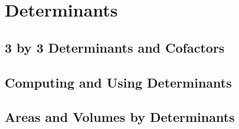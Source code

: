 \chapter{Determinants}
\section{3 by 3 Determinants and Cofactors}
\section{Computing and Using Determinants}
\section{Areas and Volumes by Determinants}